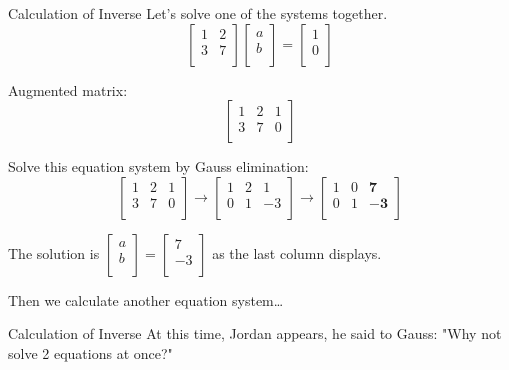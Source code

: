 \documentclass{beamer}
\begin{document}
\begin{frame}{Calculation of Inverse}
Let's solve one of the systems together.
\begin{equation*}
    \left[ \begin{matrix}
        1&		2\\
        3&		7\\
    \end{matrix} \right] \left[ \begin{array}{c}
        a\\
        b\\
    \end{array} \right] =\left[ \begin{array}{c}
        1\\
        0\\
    \end{array} \right]
\end{equation*}

Augmented matrix:
\begin{equation*}
    \left[ \begin{matrix}
        1&		2&		1\\
        3&		7&		0\\
    \end{matrix} \right]
\end{equation*}

Solve this equation system by Gauss elimination:
\begin{equation*}
    \left[ \begin{matrix}
        1&		2&		1\\
        3&		7&		0\\
    \end{matrix} \right] \rightarrow \left[ \begin{matrix}
        1&		2&		1\\
        0&		1&		-3\\
    \end{matrix} \right] \rightarrow \left[ \begin{matrix}
        1&		0&		\mathbf{7}\\
        0&		1&		\mathbf{-3}\\
    \end{matrix} \right]
\end{equation*}

The solution is $\left[ \begin{array}{c}
	a\\
	b\\
\end{array} \right] =\left[ \begin{array}{c}
	7\\
	-3\\
\end{array} \right] $ as the last column displays.

Then we calculate another equation system\dots


\end{frame}

\begin{frame}{Calculation of Inverse}
At this time, Jordan appears, he said to Gauss: "Why not solve 2 equations at once?"
\end{frame}
\end{document}
